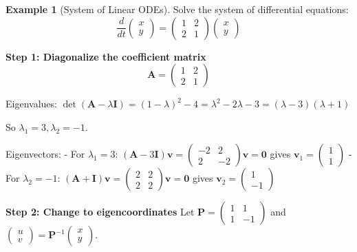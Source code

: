 \documentclass[12pt]{article}
\numberwithin{equation}{section}
\newcommand{\vect}[1]{\boldsymbol{#1}}   %
\newcommand{\mat}[1]{\mathbf{#1}}        %
\theoremstyle{plain}
\theoremstyle{definition}
\newtheorem{example}[theorem]{Example}
\theoremstyle{remark}
\begin{document}
\begin{example}[System of Linear ODEs]
Solve the system of differential equations:
$$\frac{d}{dt}\begin{pmatrix} x \\ y \end{pmatrix} = \begin{pmatrix} 1 & 2 \\ 2 & 1 \end{pmatrix}\begin{pmatrix} x \\ y \end{pmatrix}$$

\textbf{Step 1: Diagonalize the coefficient matrix}
$$\mat{A} = \begin{pmatrix} 1 & 2 \\ 2 & 1 \end{pmatrix}$$

Eigenvalues: $\det(\mat{A} - \lambda\mat{I}) = (1-\lambda)^2 - 4 = \lambda^2 - 2\lambda - 3 = (\lambda-3)(\lambda+1)$

So $\lambda_1 = 3, \lambda_2 = -1$.

Eigenvectors:
- For $\lambda_1 = 3$: $(\mat{A} - 3\mat{I})\vect{v} = \begin{pmatrix} -2 & 2 \\ 2 & -2 \end{pmatrix}\vect{v} = \vect{0}$ gives $\vect{v}_1 = \begin{pmatrix} 1 \\ 1 \end{pmatrix}$
- For $\lambda_2 = -1$: $(\mat{A} + \mat{I})\vect{v} = \begin{pmatrix} 2 & 2 \\ 2 & 2 \end{pmatrix}\vect{v} = \vect{0}$ gives $\vect{v}_2 = \begin{pmatrix} 1 \\ -1 \end{pmatrix}$

\textbf{Step 2: Change to eigencoordinates}
Let $\mat{P} = \begin{pmatrix} 1 & 1 \\ 1 & -1 \end{pmatrix}$ and $\begin{pmatrix} u \\ v \end{pmatrix} = \mat{P}^{-1}\begin{pmatrix} x \\ y \end{pmatrix}$.


\end{example}
\end{document}
